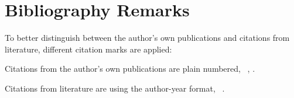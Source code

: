 \section{Bibliography Remarks}
\label{sec:intro:BibRemarks}
To better distinguish between the author's own publications and citations from literature, different citation marks are applied:
\begin{compactitem}
  \item Citations from the author's own publications are plain numbered, \eg~, .
  \item Citations from literature are using the author-year format, \eg~.
\end{compactitem}

